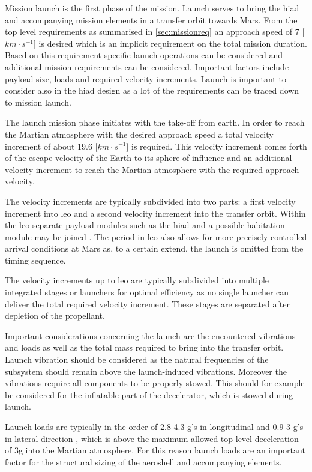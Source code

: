 Mission launch is the first phase of the mission. Launch serves to bring the \gls{hiad} and accompanying mission elements in a transfer orbit towards Mars. From the top level requirements as summarised in \ref{sec:missionreq} an approach speed of 7 [$km\cdot s^{-1}$] is desired which is an implicit requirement on the total mission duration.
Based on this requirement specific launch operations can be considered and additional mission requirements can be considered. Important factors include payload size, loads and required velocity increments. Launch is important to consider also in the \gls{hiad} design as a lot of the requirements can be traced down to mission launch.

The launch mission phase initiates with the take-off from earth. In order to reach the Martian atmosphere with the desired approach speed a total velocity increment of about 19.6 [$km\cdot s^{-1}$] is required. This velocity increment comes forth of the escape velocity of the Earth to its sphere of influence and an additional velocity increment to reach the Martian atmosphere with the required approach velocity.

The velocity increments are typically subdivided into two parts: a first velocity increment into \gls{leo} and a second velocity increment into the transfer orbit. Within the \gls{leo} separate payload modules such as the \gls{hiad} and a possible habitation module may be joined \cite{George2009}. The period in \gls{leo} also allows for more precisely controlled arrival conditions at Mars as, to a certain extend, the launch is omitted from the timing sequence. 

The velocity increments up to \gls{leo} are typically subdivided into multiple integrated stages or launchers for optimal efficiency as no single launcher can deliver the total required velocity increment. These stages are separated after depletion of the propellant.

Important considerations concerning the launch are the encountered vibrations and loads as well as the total mass required to bring into the transfer orbit. Launch vibration should be considered as the natural frequencies of the subsystem should remain above the launch-induced vibrations. Moreover the vibrations require all components to be properly stowed. This should for example be considered for the inflatable part of the decelerator, which is stowed during launch.

Launch loads are typically in the order of 2.8-4.3 g's in longitudinal and 0.9-3 g's in lateral direction \cite{Wertz2011}, which is above the maximum allowed top level deceleration of 3g into the Martian atmosphere. For this reason launch loads are an important factor for the structural sizing of the aeroshell and accompanying elements. 

